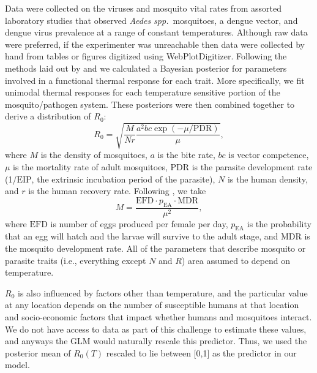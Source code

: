 \documentclass[12pt]{article}
\begin{document}
Data were collected on
the viruses and mosquito vital rates from assorted laboratory studies that
observed {\it Aedes spp.}~mosquitoes, a dengue vector, and dengue virus
prevalence at a range of constant temperatures. Although raw data were
preferred, if the experimenter was unreachable then data were collected by
hand from tables or figures digitized using WebPlotDigitizer. Following the
methods laid out by
\citet{mordecai:etal:2013} and \citet{johnson:etal:2015} we calculated a
Bayesian posterior for parameters involved in a functional thermal response
for each trait. More specifically, we fit unimodal thermal responses for each
temperature sensitive portion of the mosquito/pathogen system. These
posteriors were then combined together to derive a distribution
of $R_0$:
\begin{equation}
R_0 = \sqrt{\frac{M}{Nr} \frac{a^2bc\exp{(-\mu/\mathrm{PDR})}}{\mu}}, \label{eq:R0}
\end{equation}
where $M$ is the density of mosquitoes, $a$ is the bite rate, $bc$ is vector
competence, $\mu$ is the mortality rate of adult mosquitoes, $\mathrm{PDR}$ is
the parasite development rate (1/$\mathrm{EIP}$, the extrinsic incubation
period of the parasite), $N$ is the human density, and $r$ is the human
recovery rate. Following \cite{mordecai:etal:2013}, we take 
\begin{equation}
M=\frac{\mathrm{EFD} \cdot p_{\mathrm{EA}} \cdot \mathrm{MDR}}{\mu^2}, \label{eq:M}
\end{equation}
where $\mathrm{EFD}$ is number of eggs produced per female per day,
$p_{\mathrm{EA}}$ is the probability that an egg will hatch and the larvae
will survive to the adult stage, and $\mathrm{MDR}$ is the mosquito
development rate. All of the parameters that describe mosquito or parasite
traits (i.e., everything except $N$ and $R$) area assumed to depend on
temperature.

$R_0$ is also influenced by factors other than temperature, and the particular
value at any location depends on the number of susceptible humans at that
location and socio-economic factors that impact whether humans and mosquitoes
interact. We do not have access to data as part of this challenge to estimate
these values, and anyways the GLM would naturally rescale this predictor.
Thus, we used the posterior mean of $R_0(T)$ rescaled to lie between [0,1] as
the predictor in our model.

\end{document}
